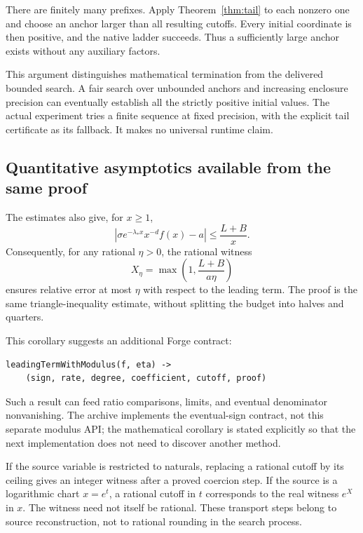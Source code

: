 There are finitely many prefixes. Apply Theorem~\ref{thm:tail} to each nonzero
one and choose an anchor larger than all resulting cutoffs. Every initial
coordinate is then positive, and the native ladder succeeds. Thus a sufficiently
large anchor exists without any auxiliary factors.

This argument distinguishes mathematical termination from the delivered bounded
search. A fair search over unbounded anchors and increasing enclosure precision
can eventually establish all the strictly positive initial values. The actual
experiment tries a finite sequence at fixed precision, with the explicit tail
certificate as its fallback. It makes no universal runtime claim.

\subsection{Quantitative asymptotics available from the same proof}

The estimates also give, for $x\ge1$,
\begin{equation}
 \left|\sigma e^{-\lambda_*x}x^{-d}f(x)-a\right|
 \le\frac{L+B}{x}.
 \label{eq:relative-modulus}
\end{equation}
Consequently, for any rational $\eta>0$, the rational witness
\[
 X_\eta=\max\left(1,\frac{L+B}{a\eta}\right)
\]
ensures relative error at most $\eta$ with respect to the leading term.
The proof is the same triangle-inequality estimate, without splitting the
budget into halves and quarters.

This corollary suggests an additional Forge contract:
\par\noindent\begin{minipage}{\linewidth}
\begin{lstlisting}
leadingTermWithModulus(f, eta) ->
    (sign, rate, degree, coefficient, cutoff, proof)
\end{lstlisting}
\end{minipage}\par
Such a result can feed ratio comparisons, limits, and eventual denominator
nonvanishing. The archive implements the eventual-sign contract, not this
separate modulus API; the mathematical corollary is stated explicitly so that
the next implementation does not need to discover another method.

If the source variable is restricted to naturals, replacing a rational cutoff
by its ceiling gives an integer witness after a proved coercion step. If the
source is a logarithmic chart $x=e^t$, a rational cutoff in $t$ corresponds to
the real witness $e^X$ in $x$. The witness need not itself be rational. These
transport steps belong to source reconstruction, not to rational rounding in
the search process.

